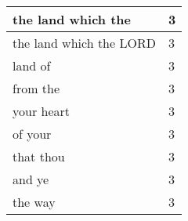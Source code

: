 \begin{center}
\begin{longtable}{|p{3.0in}|p{0.5in}|}
the land which the & 3\\ \hline 
the land which the LORD & 3\\ \hline 
land of & 3\\ \hline 
from the & 3\\ \hline 
your heart & 3\\ \hline 
of your & 3\\ \hline 
that thou & 3\\ \hline 
and ye & 3\\ \hline 
the way & 3\\ \hline 
\end{longtable}
\end{center}





